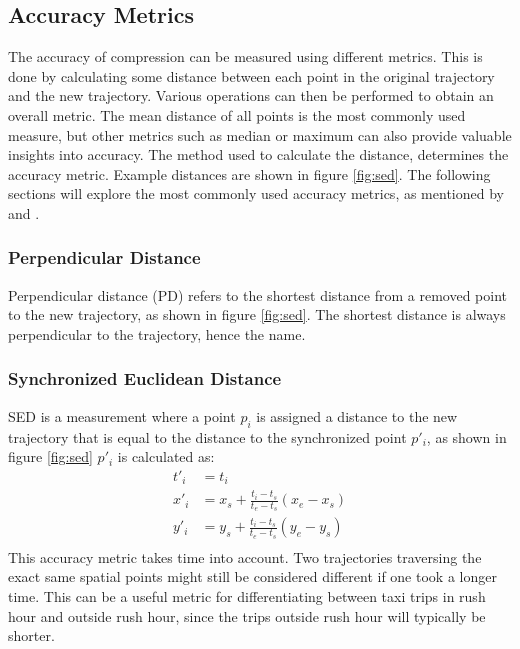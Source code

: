 \subsection{Accuracy Metrics}
The accuracy of compression can be measured using different metrics. This is done by calculating some distance between each point in the original trajectory and the new trajectory. Various operations can then be performed to obtain an overall metric. The mean distance of all points is the most commonly used measure, but other metrics such as median or maximum can also provide valuable insights into accuracy. The method used to calculate the distance, determines the accuracy metric. Example distances are shown in figure \ref{fig:sed}. The following sections will explore the most commonly used accuracy metrics, as mentioned by \textcite{TrajFramework} and \textcite{Sun2016}.

\subsubsection{Perpendicular Distance}
\label{subsec:PD}
Perpendicular distance (PD) refers to the shortest distance from a removed point to the new trajectory, as shown in figure \ref{fig:sed}. The shortest distance is always perpendicular to the trajectory, hence the name.

\subsubsection{Synchronized Euclidean Distance}
\label{subsub:SED}
SED is a measurement where a point $p_{i}$ is assigned a distance to the new trajectory that is equal to the distance to the synchronized point $p'_{i}$, as shown in figure \ref{fig:sed} $p'_{i}$ is calculated as:
\begin{equation}
    \begin{aligned}
        t'_{i} & = t_{i}                                                \\
        x'_{i} & = x_{s} + \frac{t_{i}-t_{s}}{t_{e}-t_{s}}(x_{e}-x_{s}) \\
        y'_{i} & = y_{s} + \frac{t_{i}-t_{s}}{t_{e}-t_{s}}(y_{e}-y_{s}) \\
    \end{aligned}
\end{equation}
This accuracy metric takes time into account. Two trajectories traversing the exact same spatial points might still be considered different if one took a longer time. This can be a useful metric for differentiating between taxi trips in rush hour and outside rush hour, since the trips outside rush hour will typically be shorter.


